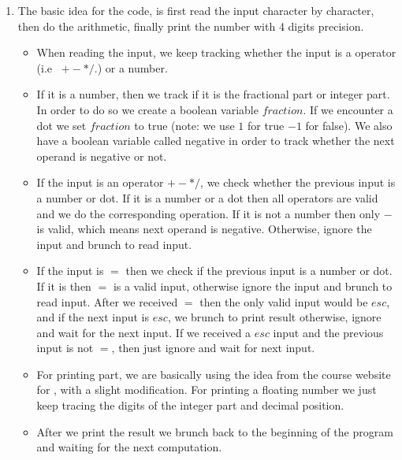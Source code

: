 \documentclass[11pt,twoside]{article}
\begin{document}
\begin{enumerate}[leftmargin=0pt]

\item The basic idea for the code, is first read the input character by character, then do the arithmetic, finally print the number with 4 digits precision. 
\begin{itemize}[label={}]
	\item When reading the input, we keep tracking whether the input is a operator (i.e \ $+-*/ .$) or a number.
	\item If it is a number, then we track if it is the fractional part or integer part. In order to do so we create a boolean variable $fraction$. If we encounter a dot we set  $fraction$ to true (note: we use $1$ for true $-1$ for false).
	We also have a boolean variable called negative in order to track whether the next operand is negative
	or not. 
	\item If the input is an operator $+ - */$, we check whether the previous input is a number or dot. If it is a number or a dot then all operators are valid and we do the corresponding operation. If it is not a number then only $-$ is valid, which means next operand is negative. Otherwise, ignore the input and brunch to read input.
	\item If the input is $=$ then we check if the previous input is a number or dot. If it is then $=$ is a valid input, otherwise ignore the input and brunch to read input. After we received $=$ then the only valid input would be $esc$, and if the next input is $esc$, we brunch to print result otherwise, ignore and wait for the next input.
	If we received a $esc$ input and the previous input is not $=$, then just ignore and wait for next input.
	\item For printing part, we are basically using the idea from the course website for , with a slight modification. For printing a floating number we just keep tracing the digits of the integer part and decimal position. 
	\item After we print the result we brunch back to the beginning of the program and waiting for the next computation. 
	

\end{itemize}
\end{enumerate}
\end{document}
